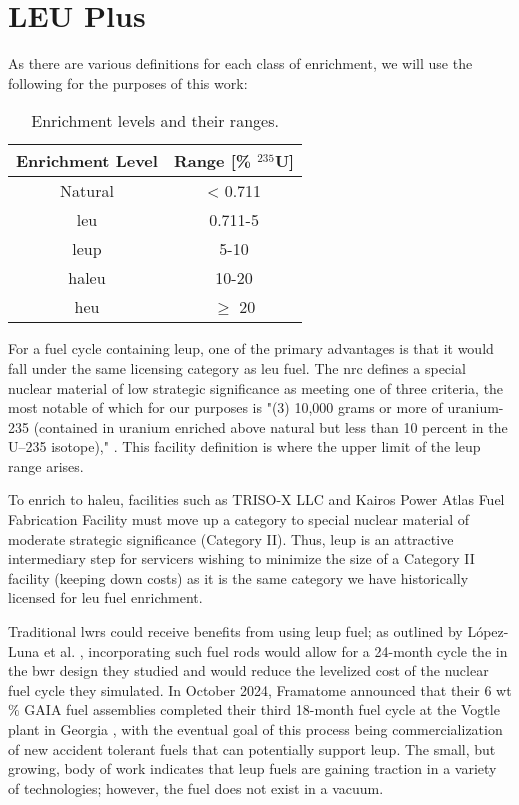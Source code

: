 \section{LEU Plus}
\label{sec:leup}

As there are various definitions for each class of enrichment, we will use the following for the purposes of this work:

\begin{table}[htbp]
   \centering
   \caption{Enrichment levels and their ranges.}
   \label{tab:enrichment_levels}
   \begin{tabular}{c c}
      \hline
      \textbf{Enrichment Level} & \textbf{Range [\%  $^{235}$U]} \\
      \hline
      Natural & < 0.711 \\
      \gls{leu} & 0.711-5 \\
      \gls{leup} & 5-10 \\
      \gls{haleu} & 10-20 \\
      \gls{heu} & $\geq$ 20  \\
      \hline
   \end{tabular}
\end{table}

For a fuel cycle containing \gls{leup}, one of the primary advantages is that it would fall under the same licensing category as \gls{leu} fuel. The \gls{nrc} defines a special nuclear material of low strategic significance \cite{nrc_catiii} as meeting one of three criteria, the most notable of which for our purposes is "(3) 10,000 grams or more of uranium-235 (contained in uranium enriched above natural but less than 10 percent in the U–235 isotope)," \cite{nrc_catiii}. This facility definition is where the upper limit of the \gls{leup} range arises.

To enrich to \gls{haleu}, facilities such as TRISO-X LLC and Kairos Power Atlas Fuel Fabrication Facility must move up a category to special nuclear material of moderate strategic significance (Category II). Thus, \gls{leup} is an attractive intermediary step for servicers wishing to minimize the size of a Category II facility (keeping down costs) as it is the same category we have historically licensed for \gls{leu} fuel enrichment.

Traditional \glspl{lwr} could receive benefits from using \gls{leup} fuel; as outlined by L\'{o}pez-Luna et al. \cite{24_month_cycle_bwr}, incorporating such fuel rods would allow for a 24-month cycle the in the \gls{bwr} design they studied and would reduce the levelized cost of the nuclear fuel cycle they simulated. In October 2024, Framatome announced that their 6 wt$\%$ GAIA fuel assemblies completed their third 18-month fuel cycle at the Vogtle plant in Georgia \cite{framatome_press_2024}, with the eventual goal of this process being commercialization of new accident tolerant fuels that can potentially support \gls{leup}. The small, but growing, body of work indicates that \gls{leup} fuels are gaining traction in a variety of technologies; however, the fuel does not exist in a vacuum.

